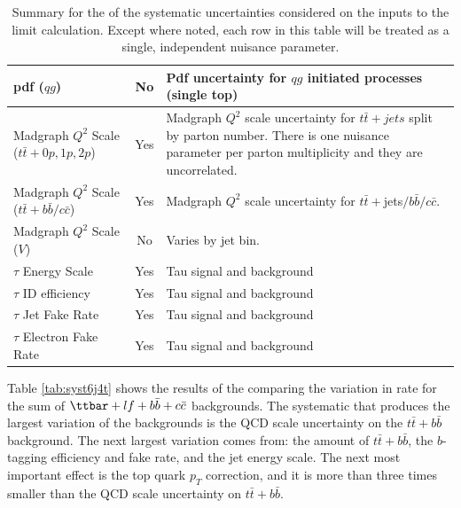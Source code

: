 \begin{table}[hbtp]
\begin{tabular}{lcp{}}
pdf ($qg$)                        & No     & Pdf uncertainty for $qg$ initiated processes (single top) \\
\hline
Madgraph $Q^2$ Scale ($t\bar{t}+0p,1p,2p$)  & Yes    & Madgraph $Q^2$ scale uncertainty for $t\bar{t}+jets$ split by parton number. There is one nuisance parameter per parton multiplicity and they are uncorrelated.\\
Madgraph $Q^2$ Scale ($t\bar{t}+b\bar{b}/c\bar{c}$)  & Yes    & Madgraph $Q^2$ scale uncertainty for $t\bar{t}+$jets$/b\bar{b}/c\bar{c}$. \\
Madgraph $Q^2$ Scale ($V$)        & No     & Varies by jet bin. \\
\hline
$\tau$ Energy Scale               & Yes    & Tau signal and background \\
$\tau$ ID efficiency              & Yes    & Tau signal and background \\
$\tau$ Jet Fake Rate              & Yes    & Tau signal and background \\
$\tau$ Electron Fake Rate         & Yes    & Tau signal and background \\
\hline\hline
\end{tabular}
\caption{Summary for the of the systematic uncertainties considered on the inputs to the limit calculation.  Except where noted, each row in this table will be treated as a single, independent nuisance parameter.}
\label{tab:systSummary}
\end{table}


\par Table \ref{tab:syst6j4t} shows the results of the comparing the
variation in rate for the sum of $\ttbar+lf+b\bar{b}+c\bar{c}$
backgrounds. The systematic that produces the largest variation of the
backgrounds is the QCD scale uncertainty on the $t\bar{t}+b\bar{b}$
background. The next largest variation comes from: the amount of
$t\bar{t}+b\bar{b}$, the $b$-tagging efficiency and fake rate, and the
jet energy scale. The next most important effect is the top quark
$p_{T}$ correction, and it is more than three times smaller than the
QCD scale uncertainty on $t\bar{t}+b\bar{b}$. 

